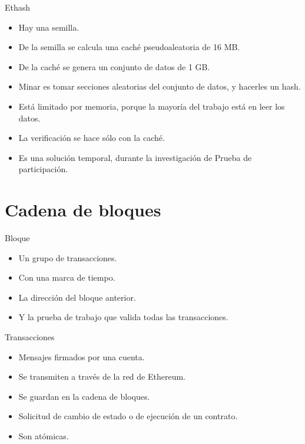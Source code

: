 \documentclass[10pt]{beamer}
\begin{document}
\begin{frame}{Ethash}

  \begin{itemize}
    \item Hay una semilla.
    \item De la semilla se calcula una caché pseudoaleatoria de 16 MB.
    \item De la caché se genera un conjunto de datos de 1 GB.
    \item Minar es tomar secciones aleatorias del conjunto de datos, y hacerles un hash.
    \item Está limitado por memoria, porque la mayoría del trabajo está en leer los datos.
    \item La verificación se hace sólo con la caché.
    \item Es una solución temporal, durante la investigación de Prueba de participación.
  \end{itemize}
  
\end{frame}

\section{Cadena de bloques}

\begin{frame}{Bloque}
	\begin{itemize}
		\item Un grupo de transacciones.
		\item Con una marca de tiempo.
		\item La dirección del bloque anterior.
		\item Y la prueba de trabajo que valida todas las transacciones.
	\end{itemize}
\end{frame}

\begin{frame}{Transacciones}
	\begin{itemize}
		\item Mensajes firmados por una cuenta.
		\item Se transmiten a través de la red de Ethereum.
		\item Se guardan en la cadena de bloques.
		\item Solicitud de cambio de estado o de ejecución de un contrato.
		\item Son atómicas.
	\end{itemize}
\end{frame}
\end{document}
